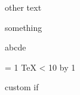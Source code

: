 \def\test{\dimen5 {#2} \alpha}


\def\test{\dimen} other text


\if something \fi


 a\or b\or c\or d\else e\fi


 = 1
\loop
  \TeX
\ifnum{} < 10
\advance{} by 1
\repeat


\if@director
 custom if
\else
\fi

\relax


